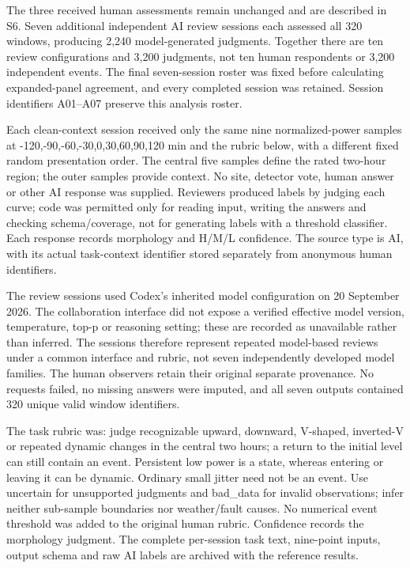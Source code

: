 \documentclass[a4paper,11pt]{article}
\begin{document}
The three received human assessments remain unchanged and are described in S6. Seven additional independent AI review sessions each assessed all 320 windows, producing 2,240 model-generated judgments. Together there are ten review configurations and 3,200 judgments, not ten human respondents or 3,200 independent events. The final seven-session roster was fixed before calculating expanded-panel agreement, and every completed session was retained. Session identifiers A01--A07 preserve this analysis roster.

Each clean-context session received only the same nine normalized-power samples at -120,-90,-60,-30,0,30,60,90,120 min and the rubric below, with a different fixed random presentation order. The central five samples define the rated two-hour region; the outer samples provide context. No site, detector vote, human answer or other AI response was supplied. Reviewers produced labels by judging each curve; code was permitted only for reading input, writing the answers and checking schema/coverage, not for generating labels with a threshold classifier. Each response records morphology and H/M/L confidence. The source type is AI, with its actual task-context identifier stored separately from anonymous human identifiers.

The review sessions used Codex's inherited model configuration on 20 September 2026. The collaboration interface did not expose a verified effective model version, temperature, top-p or reasoning setting; these are recorded as unavailable rather than inferred. The sessions therefore represent repeated model-based reviews under a common interface and rubric, not seven independently developed model families. The human observers retain their original separate provenance. No requests failed, no missing answers were imputed, and all seven outputs contained 320 unique valid window identifiers.

The task rubric was: judge recognizable upward, downward, V-shaped, inverted-V or repeated dynamic changes in the central two hours; a return to the initial level can still contain an event. Persistent low power is a state, whereas entering or leaving it can be dynamic. Ordinary small jitter need not be an event. Use uncertain for unsupported judgments and bad\_data for invalid observations; infer neither sub-sample boundaries nor weather/fault causes. No numerical event threshold was added to the original human rubric. Confidence records the morphology judgment. The complete per-session task text, nine-point inputs, output schema and raw AI labels are archived with the reference results.
\end{document}
